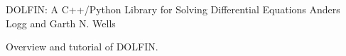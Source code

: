               {DOLFIN: A C++/Python Library for Solving Differential Equations}
              {Anders Logg and Garth N. Wells}

\editornote{[logg-2]}

Overview and tutorial of DOLFIN.
